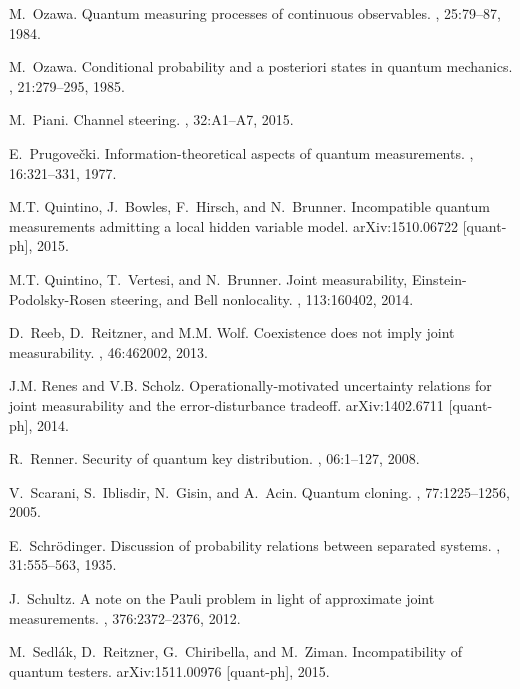 \documentclass[12pt]{iopart}
\theoremstyle{definition}
\begin{document}
{\begin{thebibliography}{10}
M.~Ozawa.
\newblock Quantum measuring processes of continuous observables.
, 25:79--87, 1984.

M.~Ozawa.
\newblock Conditional probability and a posteriori states in quantum mechanics.
, 21:279--295, 1985.

M.~Piani.
\newblock Channel steering.
, 32:A1--A7, 2015.

E.~Prugove\v{c}ki.
\newblock Information-theoretical aspects of quantum measurements.
, 16:321--331, 1977.

M.T. Quintino, J.~Bowles, F.~Hirsch, and N.~Brunner.
\newblock Incompatible quantum measurements admitting a local hidden variable
  model.
\newblock arXiv:1510.06722 [quant-ph], 2015.

M.T. Quintino, T.~Vertesi, and N.~Brunner.
\newblock Joint measurability, {E}instein-{P}odolsky-{R}osen steering, and
  {B}ell nonlocality.
, 113:160402, 2014.

D.~Reeb, D.~Reitzner, and M.M. Wolf.
\newblock Coexistence does not imply joint measurability.
, 46:462002, 2013.

J.M. Renes and V.B. Scholz.
\newblock Operationally-motivated uncertainty relations for joint measurability
  and the error-disturbance tradeoff.
\newblock arXiv:1402.6711 [quant-ph], 2014.

R.~Renner.
\newblock Security of quantum key distribution.
, 06:1--127, 2008.

V.~Scarani, S.~Iblisdir, N.~Gisin, and A.~Acin.
\newblock Quantum cloning.
, 77:1225--1256, 2005.

E.~Schr{\"o}dinger.
\newblock Discussion of probability relations between separated systems.
, 31:555--563, 1935.

J.~Schultz.
\newblock A note on the {P}auli problem in light of approximate joint
  measurements.
, 376:2372--2376, 2012.

M.~Sedl{\'a}k, D.~Reitzner, G.~Chiribella, and M.~Ziman.
\newblock Incompatibility of quantum testers.
\newblock arXiv:1511.00976 [quant-ph], 2015.


\end{thebibliography}}
\end{document}
